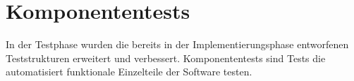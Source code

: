 \section{Komponententests}
In der Testphase wurden die bereits in der Implementierungsphase entworfenen Teststrukturen erweitert und verbessert.
Komponententests sind Tests die automatisiert funktionale Einzelteile der Software testen.


